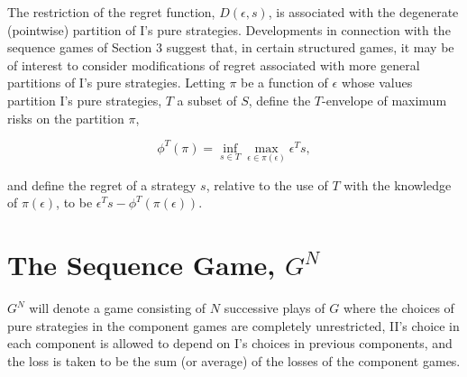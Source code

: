 \documentclass[11pt]{article}
\numberwithin{equation}{section}
\theoremstyle{boldStyle}
\begin{document}
The restriction of the regret function, \( D(\epsilon, s) \), is associated with the degenerate (pointwise) partition of I's pure strategies. 
Developments in connection with the sequence games of Section 3 suggest that, in certain structured games, 
it may be of interest to consider modifications of regret associated with more general partitions of I's pure strategies. 
Letting \( \pi \) be a function of \( \epsilon \) whose values partition I's pure strategies, 
\( T \) a subset of \( S \), define the \( T \)-envelope of maximum risks on the partition \( \pi \),

\begin{equation}
    \phi^T (\pi) = \inf_{s \in T} \max_{\epsilon \in \pi (\epsilon)} \epsilon^T s,
\end{equation}

and define the regret of a strategy \( s \), relative to the use of \( T \) with the knowledge of \( \pi (\epsilon) \), 
to be \( \epsilon^T s - \phi^T (\pi( \epsilon )) \).













\newpage
\section{The Sequence Game, $G^N$}



\( G^N \) will denote a game consisting of \( N \) successive plays of \( G \) where the choices of 
pure strategies in the component 
games are completely unrestricted, II's choice in each component is allowed to depend on I's 
choices in previous components, 
and the loss is taken to be the sum (or average) of the losses of the component games.
\end{document}
